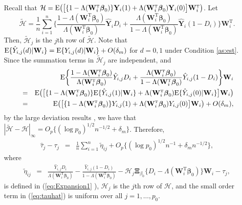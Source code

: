\documentclass[12pt]{article}
\def\bea{\begin{eqnarray}}
\def\eea{\end{eqnarray}}
\def\nn{\nonumber}
\def\T{{ \mathrm{\scriptscriptstyle T} }}
\theoremstyle{definition}
\newcommand{\E}{\rm E}
\newcommand{\bW}{{\mathbf W}}
\newcommand{\bY}{{\mathbf Y}}
\newcommand{\bbeta}  {\boldsymbol{\beta}}
\newcommand{\bXi}{\boldsymbol{\Xi}}
\begin{document}
Recall that $\mathcal{H} = {\E}\big( \big[ \{1 - \Lambda(\bW_{i}^{\T}\bbeta_{0})\} \bY_{i}(1) + \Lambda(\bW_{i}^{\T}\bbeta_{0})\bY_{i}(0) \big] \bW_{i}^{\T} \big)$. 
Let 
$$\tilde{\mathcal{H}} = 
\frac{1}{n}\sum_{i = 1}^{n}\bigg\{\frac{1 - \Lambda(\bW_{i}^{\T}\bbeta_{0})}{\Lambda(\bW_{i}^{\T}\bbeta_{0})} \hat{\bY}_{i}D_{i} + \frac{\Lambda(\bW_{i}^{\T} \bbeta_{0})}{1 - \Lambda(\bW_{i}^{\T} \bbeta_{0})} \hat{\bY}_{i}(1 - D_{i}) \bigg\} \bW_{i}^{\T}.$$
Then, $\tilde{\mathcal{H}}_{j}$ is the $j$th row of $\tilde{\mathcal{H}}$. 
Note that ${\E}\{\hat{Y}_{i, j}(d)|\bW_i\} = {\E}\{Y_{i, j}(d)|\bW_i\} + O(\delta_m)$ for $d = 0, 1$ under Condition \ref{as:est}.
Since the summation terms in $\tilde{\mathcal{H}}_{j}$ are independent, and 
\bea
&&{\E}\bigg\{\frac{1 - \Lambda(\bW_{i}^{\T}\bbeta_{0})}{\Lambda(\bW_{i}^{\T}\bbeta_{0})} \hat{Y}_{i, j}D_{i} + \frac{\Lambda(\bW_{i}^{\T} \bbeta_{0})}{1 - \Lambda(\bW_{i}^{\T} \bbeta_{0})} \hat{Y}_{i, j}(1 - D_{i}) \bigg\} \bW_{i} \nn \\
&=& 
{\E}\big( \big[ \{1 - \Lambda(\bW_{i}^{\T}\bbeta_{0})\}{\E}\{\hat{Y}_{i,j}(1) | \bW_i\} + \Lambda(\bW_{i}^{\T} \bbeta_{0}) {\E}\{\hat{Y}_{i,j}(0) | \bW_i\} \big] \bW_{i} \big) \nn \\
&=&
{\E}\big( \big[ \{1 - \Lambda(\bW_{i}^{\T}\bbeta_{0})\}Y_{i,j}(1) + \Lambda(\bW_{i}^{\T} \bbeta_{0}) Y_{i,j}(0) \big] \bW_{i} \big) + O(\delta_m), \nn
\eea
by the large deviation results \citep{petrov2012sums}, we have that $|\tilde{\mathcal{H}} - \mathcal{H}|_{\infty} = O_p\{(\log p_0)^{1/2}n^{-1/2} + \delta_m\}$. Therefore, 
\bea
\hat{\tau}_{j} - \tau_{j}
&=& 
\frac{1}{n}\sum_{i = 1}^{n} \tilde{\eta}_{ij}
+ 
O_{p}\{(\log p_0)^{1/2}n^{-1} + \delta_m n^{-1/2}\},\label{eq:tauhat}
\eea
where 
\bea
\tilde{\eta}_{ij} &=& \frac{\hat{Y}_{i, j}D_{i}}{\Lambda(\bW_{i}^{\T}\bbeta_{0})} - \frac{\hat{Y}_{i, j}(1 - D_{i})}{1 - \Lambda(\bW_{i}^{\T}\bbeta_{0})} - \mathcal{H}_{j} \bXi_{\beta_{0}} \{D_{i} - \Lambda(\bW_{i}^{\T}\bbeta_{0})\} \bW_{i} - \tau_j, 
\nn\eea
is defined in (\ref{eq:Expansion1} ), $\mathcal{H}_{j}$ is the $j$th row of $\mathcal{H}$, and the small order term 
in (\ref{eq:tauhat})
is uniform over all $j = 1, \ldots, p_0$. 
\end{document}
